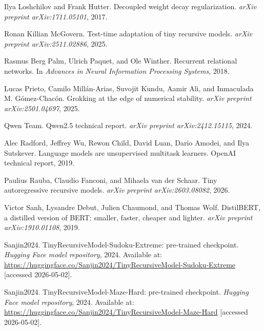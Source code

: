\documentclass{article}
\begin{document}
\begin{thebibliography}{}
Ilya Loshchilov and Frank Hutter.
Decoupled weight decay regularization.
\textit{arXiv preprint arXiv:1711.05101}, 2017.

Ronan Killian McGovern.
Test-time adaptation of tiny recursive models.
\textit{arXiv preprint arXiv:2511.02886}, 2025.

Rasmus Berg Palm, Ulrich Paquet, and Ole Winther.
Recurrent relational networks.
In \textit{Advances in Neural Information Processing Systems}, 2018.

Lucas Prieto, Camilo Mill\'an-Arias, Suvojit Kundu, Aamir Ali, and Inmaculada M. G\'omez-Chac\'on.
Grokking at the edge of numerical stability.
\textit{arXiv preprint arXiv:2501.04697}, 2025.

{Qwen Team}.
Qwen2.5 technical report.
\textit{arXiv preprint arXiv:2412.15115}, 2024.

Alec Radford, Jeffrey Wu, Rewon Child, David Luan, Dario Amodei, and Ilya Sutskever.
Language models are unsupervised multitask learners.
OpenAI technical report, 2019.

Paulius Rauba, Claudio Fanconi, and Mihaela van der Schaar.
Tiny autoregressive recursive models.
\textit{arXiv preprint arXiv:2603.08082}, 2026.

Victor Sanh, Lysandre Debut, Julien Chaumond, and Thomas Wolf.
DistilBERT, a distilled version of BERT: smaller, faster, cheaper and lighter.
\textit{arXiv preprint arXiv:1910.01108}, 2019.

Sanjin2024.
TinyRecursiveModel-Sudoku-Extreme: pre-trained checkpoint.
\textit{Hugging Face model repository}, 2024.
Available at: \url{https://huggingface.co/Sanjin2024/TinyRecursiveModel-Sudoku-Extreme} [accessed 2026-05-02].

Sanjin2024.
TinyRecursiveModel-Maze-Hard: pre-trained checkpoint.
\textit{Hugging Face model repository}, 2024.
Available at: \url{https://huggingface.co/Sanjin2024/TinyRecursiveModel-Maze-Hard} [accessed 2026-05-02].


\end{thebibliography}
\end{document}
